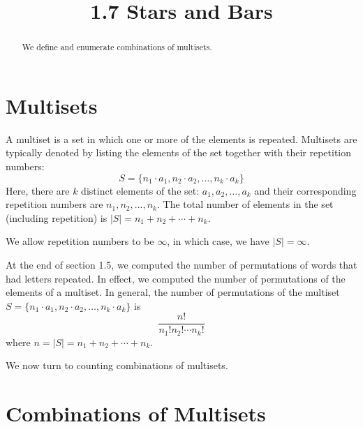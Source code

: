\documentclass[handout]{ximera}
\title{1.7 Stars and Bars}
\begin{document}
\begin{abstract}
We define and enumerate combinations of multisets.
\end{abstract}

\maketitle





\section{Multisets}

\begin{definition}[Multiset]
A multiset is a set in which one or more of the elements is repeated.  
Multisets are typically denoted by listing the elements  of the set together with their 
repetition numbers:
\[
S = \{n_1 \cdot a_1, n_2 \cdot a_2, \ldots, n_k \cdot a_k\}
\]
 Here, there are $k$ distinct elements of the set: $a_1, a_2, \ldots, a_k$
 and their corresponding repetition numbers are $n_1, n_2, ..., n_k$.
 The total number of elements in the set (including repetition) is $|S| = n_1 + n_2 + \cdots + n_k$.
 \end{definition}
 
 \begin{remark} 
 We allow repetition numbers to be $\infty$, in which case, we have $|S| = \infty$.
 \end{remark}
 
 At the end of section 1.5, we computed the number of permutations of words that had 
letters repeated.  In effect, we computed the number of permutations of the 
elements of a multiset. In general, the number of permutations of the 
 multiset $S = \{n_1 \cdot a_1, n_2 \cdot a_2, \ldots, n_k \cdot a_k\}$ is
 \[
 \frac{n!}{n_1! n_2! \cdots n_k!}
 \]
 where $n = |S| = n_1 + n_2 + \cdots + n_k$.
 
 We now turn to counting combinations of multisets.
 

\section{Combinations of Multisets}
\end{document}
